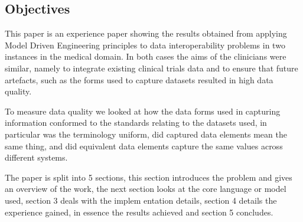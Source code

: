 

\subsection{Objectives}
This paper is an experience paper showing the results obtained from applying Model Driven Engineering principles to data interoperability problems in two instances in the medical domain. In both cases the aims of the clinicians were similar, namely to integrate existing clinical trials data and to ensure that future artefacts, such as the forms used to capture datasets resulted in high data quality. 

To measure data quality we looked at how the data forms used in capturing information conformed to the standards relating to the datasets used, in particular was the terminology uniform, did captured data elements mean the same thing, and did equivalent data elements capture the same values across different systems.


The paper is split into 5 sections, this section introduces the problem and gives an overview of the work, the next section looks at the core language or model used, section 3 deals with the implem   entation details, section 4 details the experience gained, in essence the results achieved and section 5 concludes.
